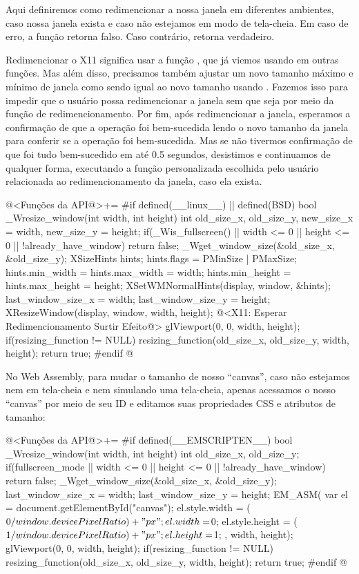 
Aqui definiremos como redimencionar a nossa janela em diferentes
ambientes, caso nossa janela exista e caso não estejamos em modo de
tela-cheia. Em caso de erro, a função retorna falso. Caso contrário,
retorna verdadeiro.


Redimencionar o X11 significa usar a
função , que já viemos usando em outras
funções. Mas além disso, precisamos também ajustar um novo tamanho
máximo e mínimo de janela como sendo igual ao novo tamanho
usando . Fazemos isso para impedir que o
usuário possa redimencionar a janela sem que seja por meio da função
de redimencionamento. Por fim, após redimencionar a janela, esperamos
a confirmação de que a operação foi bem-sucedida lendo o novo tamanho
da janela para conferir se a operação foi bem-sucedida. Mas se não
tivermos confirmação de que foi tudo bem-sucedido em até 0.5 segundos,
desistimos e continuamos de qualquer forma, executando a função
personalizada escolhida pelo usuário relacionada ao redimencionamento
da janela, caso ela exista.

\iniciocodigo
@<Funções da API@>+=
#if defined(__linux__) || defined(BSD)
bool _Wresize_window(int width, int height){
  int old_size_x, old_size_y, new_size_x = width, new_size_y = height;
  if(_Wis_fullscreen() || width <= 0 || height <= 0 || !already_have_window)
    return false;
  _Wget_window_size(&old_size_x, &old_size_y);
  {
    XSizeHints hints;
    hints.flags = PMinSize | PMaxSize;
    hints.min_width = hints.max_width = width;
    hints.min_height = hints.max_height = height;
    XSetWMNormalHints(display, window, &hints);
  }
  last_window_size_x = width;
  last_window_size_y = height;
  XResizeWindow(display, window, width, height);
  @<X11: Esperar Redimencionamento Surtir Efeito@>
  glViewport(0, 0, width, height);
  if(resizing_function != NULL)
    resizing_function(old_size_x, old_size_y, width, height);
  return true;
}
#endif
@


No Web Assembly, para mudar o tamanho de nosso ``canvas'', caso não
estejamos nem em tela-cheia e nem simulando uma tela-cheia, apenas
acessamos o nosso ``canvas'' por meio de seu ID e editamos suas
propriedades CSS e atributos de tamanho:

\iniciocodigo
@<Funções da API@>+=
#if defined(__EMSCRIPTEN__)
bool _Wresize_window(int width, int height){
  int old_size_x, old_size_y;
  if(fullscreen_mode || width <= 0 || height <= 0 || !already_have_window)
    return false;
  _Wget_window_size(&old_size_x, &old_size_y);
  last_window_size_x = width;
  last_window_size_y = height;
  EM_ASM({
    var el = document.getElementById("canvas");
    el.style.width = ($0 / window.devicePixelRatio) + "px";
    el.width = $0;
    el.style.height = ($1 / window.devicePixelRatio) + "px";
    el.height = $1;
  }, width, height);
  glViewport(0, 0, width, height);
  if(resizing_function != NULL)
    resizing_function(old_size_x, old_size_y, width, height);
  return true;
}
#endif
@

